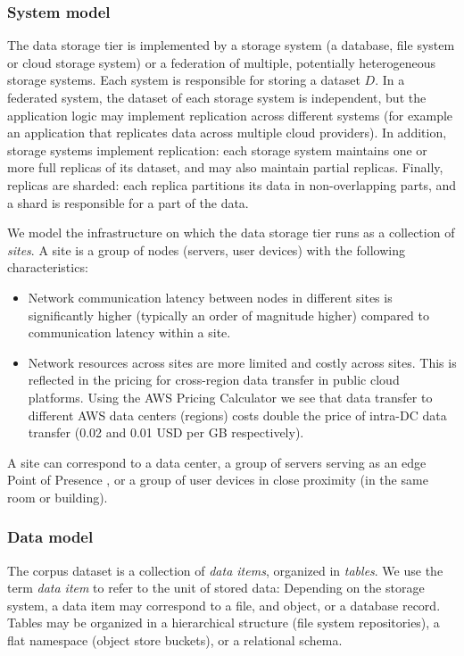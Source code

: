 \subsubsection{System model}
The data storage tier is implemented by a storage system (a database, file system or cloud storage system) or a
federation of multiple, potentially heterogeneous storage systems.
Each system is responsible for storing a dataset $D$.
In a federated system, the dataset of each storage system is independent, but the application logic may implement
replication across different systems (for example an application that replicates data across multiple cloud providers).
In addition, storage systems implement replication:
each storage system maintains one or more full replicas of its dataset, and may also maintain partial replicas.
Finally, replicas are sharded: each replica partitions its data in non-overlapping parts, and a shard is responsible
for a part of the data.

We model the infrastructure on which the data storage tier runs as a collection of \textit{sites}.
A site is a group of nodes (servers, user devices) with the following characteristics:
\begin{itemize}
  \item Network communication latency between nodes in different sites is significantly higher (typically an order of
  magnitude higher) \cite{pbailis:hats} compared to communication latency within a site.
  \item Network resources across sites are more limited and costly across sites.
  This is reflected in the pricing for cross-region data transfer in public cloud platforms.
  Using the AWS Pricing Calculator \cite{aws:costcalc} we see that data transfer to different AWS data centers
  (regions) costs double the price of intra-DC data transfer (0.02 and 0.01 USD per GB respectively).
\end{itemize}

A site can correspond to a data center, a group of servers serving as an edge Point of Presence \cite{google:infra}, or
a group of user devices in close proximity (in the same room or building).


\subsubsection{Data model}

The corpus dataset is a collection of \textit{data items}, organized in \textit{tables}.
We use the term \textit{data item} to refer to the unit of stored data:
Depending on the storage system, a data item may correspond to a file, and object, or a database record.
Tables may be organized in a hierarchical structure (file system repositories), a flat namespace (object store buckets),
or a relational schema.

